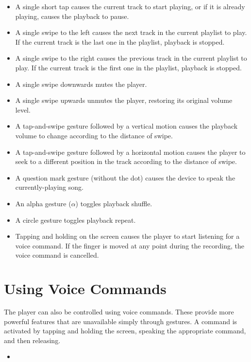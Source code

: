 \documentclass[12pt,letterpaper]{article}
\begin{document}
\begin{itemize}
\item A single short tap causes the current track to start playing, or if it is already playing, causes the playback to pause.
\item A single swipe to the left causes the next track in the current playlist to play. If the current track is the last one in the playlist, playback is stopped.
\item A single swipe to the right causes the previous track in the current playlist to play. If the current track is the first one in the playlist, playback is stopped.
\item A single swipe downwards mutes the player.
\item A single swipe upwards unmutes the player, restoring its original volume level.
\item {\color{red} A tap-and-swipe gesture followed by a vertical motion causes the playback volume to change according to the distance of swipe.}
\item {\color{red} A tap-and-swipe gesture followed by a horizontal motion causes the player to seek to a different position in the track according to the distance of swipe.}
\item {\color{red} A question mark gesture (without the dot) causes the device to speak the currently-playing song.}
\item {\color{red} An alpha gesture ($\alpha$) toggles playback shuffle.}
\item {\color{red} A circle gesture toggles playback repeat.}
\item Tapping and holding on the screen causes the player to start listening for a voice command. If the finger is moved at any point during the recording, the voice command is cancelled.
\end{itemize}

\section{Using Voice Commands}

The player can also be controlled using voice commands. These provide more powerful features that are unavailable simply through gestures. A command is activated by tapping and holding the screen, speaking the appropriate command, and then releasing.

\begin{itemize}
\item 
\end{itemize}
\end{document}
